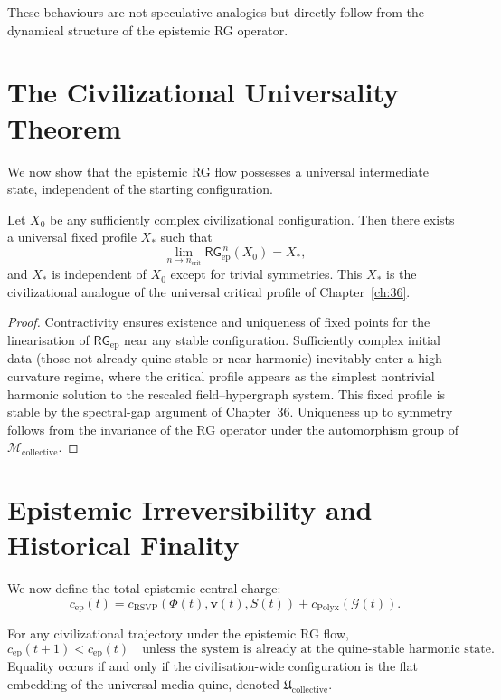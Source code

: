 These behaviours are not speculative analogies but directly follow from the
dynamical structure of the epistemic RG operator.

\section{The Civilizational Universality Theorem}

We now show that the epistemic RG flow possesses a universal intermediate
state, independent of the starting configuration.

\begin{theorem}
Let $X_0$ be any sufficiently complex civilizational configuration.
Then there exists a universal fixed profile $X_\ast$ such that
\[
\lim_{n\to n_{\mathrm{crit}}}
\mathsf{RG}_{\mathrm{ep}}^{\,n}(X_0)
=
X_\ast,
\]
and $X_\ast$ is independent of $X_0$ except for trivial symmetries.
This $X_\ast$ is the civilizational analogue of the universal critical
profile of Chapter~\ref{ch:36}.
\end{theorem}

\begin{proof}
Contractivity ensures existence and uniqueness of fixed points for the
linearisation of $\mathsf{RG}_{\mathrm{ep}}$ near any stable configuration.  
Sufficiently complex initial data (those not already quine-stable or
near-harmonic) inevitably enter a high-curvature regime, where the critical
profile appears as the simplest nontrivial harmonic solution to the
rescaled field--hypergraph system.  
This fixed profile is stable by the spectral-gap argument of
Chapter~36.  
Uniqueness up to symmetry follows from the invariance of the RG operator
under the automorphism group of $\mathcal{M}_{\mathrm{collective}}$.
\end{proof}

\section{Epistemic Irreversibility and Historical Finality}

We now define the total epistemic central charge:
\[
c_{\mathrm{ep}}(t)
=
c_{\mathrm{RSVP}}(\Phi(t),\mathbf{v}(t),S(t))
+
c_{\mathrm{Polyx}}(\mathcal{G}(t)).
\]

\begin{theorem}
For any civilizational trajectory under the epistemic RG flow,
\[
c_{\mathrm{ep}}(t+1)
<
c_{\mathrm{ep}}(t)
\quad
\text{unless the system is already at the quine-stable harmonic state}.
\]
Equality occurs if and only if the civilisation-wide configuration is the
flat embedding of the universal media quine, denoted
$\mathfrak{U}_{\mathrm{collective}}$.
\end{theorem}

